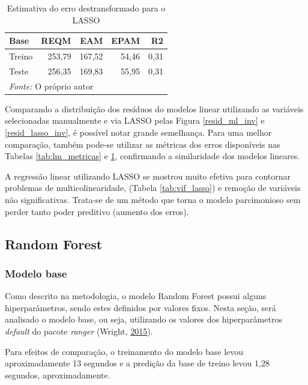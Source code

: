 \documentclass[
	12pt,				%
	a4paper,		%
	oneside,    %
	chapter=TITLE,		   %
	section=TITLE,		   %
	subsection=TITLE,	   %
	subsubsection=TITLE, %
	english,			%
	french,				%
	spanish,			%
	brazil,				%
]{abntex2}
\begin{document}
\begin{table}

\caption{\label{tab:lasso_metricas}Estimativa do erro destransformado para o LASSO}
\centering
\begin{tabular}[t]{l|r|r|r|r}
\hline
Base & REQM & EAM & EPAM & R2\\
\hline
Treino & 253,79 & 167,52 & 54,46 & 0,31\\
\hline
Teste & 256,35 & 169,83 & 55,95 & 0,31\\
\hline
\multicolumn{5}{l}{\textit{Fonte: } O próprio autor}\\
\end{tabular}
\end{table}

Comparando a distribuição dos resíduos do modelos linear utilizando as
variáveis selecionadas manualmente e via LASSO pelas Figura
\ref{resid_ml_inv} e \ref{resid_lasso_inv}, é possível notar grande
semelhança. Para uma melhor comparação, também pode-se utilizar as
métricas dos erros disponíveis nas Tabelas \ref{tab:lm_metricas} e
\ref{tab:lasso_metricas}, confirmando a similaridade dos modelos
lineares.

A regressão linear utilizando LASSO se mostrou muito efetiva para
contornar problemas de multicolinearidade, (Tabela \ref{tab:vif_lasso})
e remoção de variáveis não significativas. Trata-se de um método que
torna o modelo parcimonioso sem perder tanto poder preditivo (aumento
dos erros).

\hypertarget{random-forest}{%
\subsection{Random Forest}\label{random-forest}}

\hypertarget{modelo-base}{%
\subsubsection{Modelo base}\label{modelo-base}}

Como descrito na metodologia, o modelo Random Forest possui alguns
hiperparâmetros, sendo estes definidos por valores fixos. Nesta seção,
será analisado o modelo base, ou seja, utilizando os valores dos
hiperparâmetros \emph{default} do pacote \emph{ranger} (Wright,
\protect\hyperlink{ref-wright2015ranger}{2015}).

Para efeitos de comparação, o treinamento do modelo base levou
aproximadamente 13 segundos e a predição da base de treino levou 1,28
segundos, aproximadamente.
\end{document}
